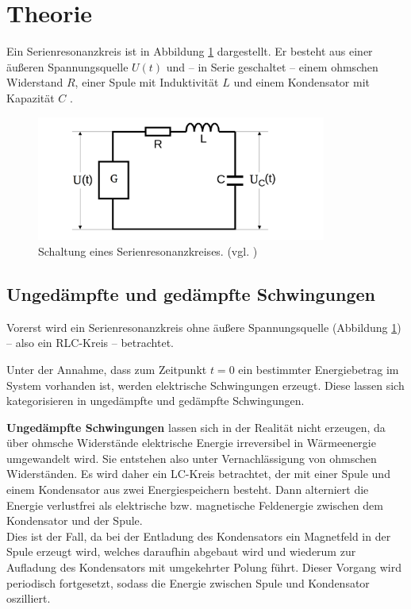 \section{Theorie}
\label{sec:Theorie}


Ein Serienresonanzkreis ist in Abbildung \ref{fig:serienreson} dargestellt.
Er besteht aus einer äußeren Spannungsquelle $U(t)$ und -- in Serie
geschaltet -- einem ohmschen Widerstand $R$, einer Spule mit Induktivität $L$ und einem Kondensator
mit Kapazität $C$ \cite{noltingbro}.

\begin{figure}
	\centering
	\includegraphics[width=0.85\textwidth]{Bilder/Aufbau.png}
	\caption{Schaltung eines Serienresonanzkreises. (vgl. \cite{Anleitung})}
	\label{fig:serienreson}
\end{figure}


\subsection{Ungedämpfte und gedämpfte Schwingungen}

Vorerst wird ein Serienresonanzkreis ohne äußere Spannungsquelle (Abbildung \ref{fig:serienreson}) -- also ein RLC-Kreis -- betrachtet.

Unter der Annahme, dass zum Zeitpunkt $t=0$ ein bestimmter Energiebetrag im System vorhanden ist,
werden elektrische Schwingungen erzeugt.
Diese lassen sich kategorisieren in ungedämpfte und gedämpfte Schwingungen.

\textbf{Ungedämpfte Schwingungen} lassen sich in der Realität nicht erzeugen, da über ohmsche
Widerstände elektrische Energie irreversibel in Wärmeenergie umgewandelt wird.
Sie entstehen also unter Vernachlässigung von ohmschen Widerständen.
Es wird daher ein LC-Kreis betrachtet, der mit einer Spule und einem Kondensator aus zwei
Energiespeichern besteht.
Dann alterniert die Energie verlustfrei als elektrische bzw. magnetische Feldenergie zwischen dem Kondensator und der Spule.\\
Dies ist der Fall, da bei der Entladung des Kondensators ein Magnetfeld in der Spule erzeugt
wird, welches daraufhin abgebaut wird und wiederum zur Aufladung des Kondensators mit
umgekehrter Polung führt. Dieser Vorgang wird periodisch fortgesetzt, sodass die Energie zwischen Spule und Kondensator oszilliert.

